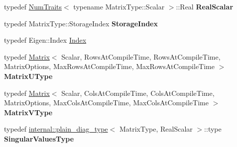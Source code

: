 \begin{DoxyCompactItemize}
\mbox{\label{class_eigen_1_1_s_v_d_base_a57f51134f3084c5b9998298569495920}} 
typedef \mbox{\hyperlink{struct_eigen_1_1_num_traits}{Num\+Traits}}$<$ typename Matrix\+Type\+::\+Scalar $>$\+::Real {\bfseries Real\+Scalar}
\item 
\mbox{\label{class_eigen_1_1_s_v_d_base_a98b3202ef30648952815e77338408f27}} 
typedef Matrix\+Type\+::\+Storage\+Index {\bfseries Storage\+Index}
\item 
typedef Eigen\+::\+Index \mbox{\hyperlink{class_eigen_1_1_s_v_d_base_a6229a37997eca1072b52cca5ee7a2bec}{Index}}
\item 
\mbox{\label{class_eigen_1_1_s_v_d_base_ab62c306c5d1efeae9bce88dee1b04965}} 
typedef \mbox{\hyperlink{class_eigen_1_1_matrix}{Matrix}}$<$ Scalar, Rows\+At\+Compile\+Time, Rows\+At\+Compile\+Time, Matrix\+Options, Max\+Rows\+At\+Compile\+Time, Max\+Rows\+At\+Compile\+Time $>$ {\bfseries Matrix\+U\+Type}
\item 
\mbox{\label{class_eigen_1_1_s_v_d_base_af2ec05d33dd5be28df6fcf56346e23ec}} 
typedef \mbox{\hyperlink{class_eigen_1_1_matrix}{Matrix}}$<$ Scalar, Cols\+At\+Compile\+Time, Cols\+At\+Compile\+Time, Matrix\+Options, Max\+Cols\+At\+Compile\+Time, Max\+Cols\+At\+Compile\+Time $>$ {\bfseries Matrix\+V\+Type}
\item 
\mbox{\label{class_eigen_1_1_s_v_d_base_a7426695e87c152fbb8bc7834dd8e6ce3}} 
typedef \mbox{\hyperlink{struct_eigen_1_1internal_1_1plain__diag__type}{internal\+::plain\+\_\+diag\+\_\+type}}$<$ Matrix\+Type, Real\+Scalar $>$\+::type {\bfseries Singular\+Values\+Type}
\end{DoxyCompactItemize}
